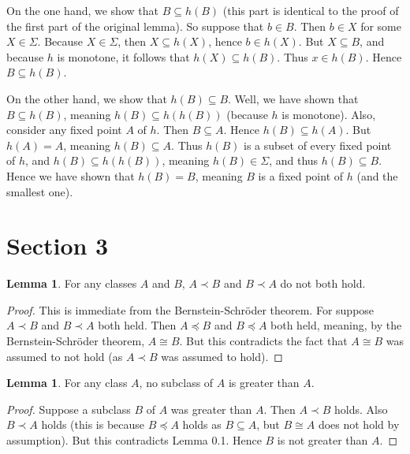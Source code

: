 \documentclass{article}
\theoremstyle{definition}
\newtheorem{lemma}[theorem]{Lemma}
\begin{document}
	On the one hand, we show that $B\subseteq h(B)$ (this part is identical to the proof of the first part of the original lemma). 
So suppose that $b\in B$. Then $b\in X$ for some $X\in\Sigma$.
Because $X\in\Sigma$, then $X\subseteq h(X)$, hence $b\in h(X)$. But $X\subseteq B$, and because $h$ is monotone, 
it follows that $h(X)\subseteq h(B)$. Thus $x\in h(B)$. Hence $B\subseteq h(B)$.
	
	On the other hand, we show that $h(B)\subseteq B$. Well, we have shown that $B\subseteq h(B)$, meaning 
$h(B)\subseteq h(h(B))$ (because $h$ is monotone). Also, consider any fixed point $A$ of $h$. Then $B\subseteq A$. 
Hence $h(B)\subseteq h(A)$. But $h(A)=A$, meaning $h(B)\subseteq A$. Thus $h(B)$ is a subset of every fixed point of 
$h$, and $h(B)\subseteq h(h(B))$, meaning $h(B)\in\Sigma$, and thus $h(B)\subseteq B$.
	Hence we have shown that $h(B)=B$, meaning $B$ is a fixed point of $h$ (and the smallest one).

\section*{Section 3}

\begin{lemma}
For any classes $A$ and $B$, $A\prec B$ and $B\prec A$ do not both hold.
\end{lemma}
\begin{proof}
This is immediate from the Bernstein-Schröder theorem. For suppose $A\prec B$ and $B\prec A$ both held. 
Then $A\preceq B$ and $B\preceq A$ both held, meaning, by the Bernstein-Schröder theorem, $A\cong B$. But this contradicts 
the fact that $A\cong B$ was assumed to not hold (as $A\prec B$ was assumed to hold).
\end{proof}

\begin{lemma}
For any class $A$, no subclass of $A$ is greater than $A$.
\end{lemma}
\begin{proof}
Suppose a subclass $B$ of $A$ was greater than $A$. Then $A\prec B$ holds. Also 
$B\prec A$ holds (this is because $B\preceq A$ holds as $B\subseteq A$, but
$B\cong A$ does not hold by assumption). But this contradicts Lemma 0.1. Hence 
$B$ is not greater than $A$.
\end{proof}
\end{document}
